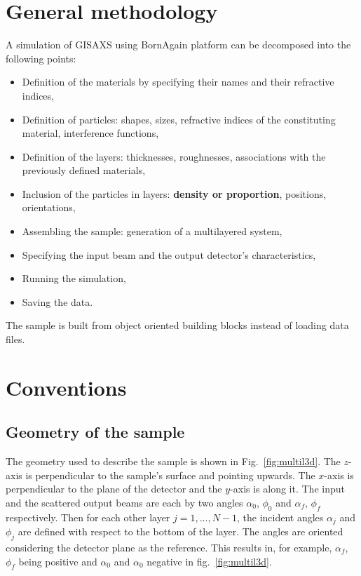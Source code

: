 \section{General methodology}
A simulation of GISAXS using BornAgain platform can be decomposed into the following points:
\begin{itemize}
\item Definition of the materials by specifying their names and their
  refractive indices,
\item Definition of particles: shapes, sizes, refractive indices of
  the constituting material, interference functions,
\item Definition of the layers: thicknesses, roughnesses, associations with the previously defined
materials,
\item Inclusion of the particles in layers: \textbf{density or proportion}, positions, orientations, 
\item Assembling the sample: generation of a multilayered system,
\item Specifying the input beam and the output detector's
  characteristics,
\item Running the simulation,
\item Saving the data.
\end{itemize}

\noindent The sample is built from object oriented building blocks instead of loading data files.

\section{Conventions}

\subsection{Geometry of the sample}

\noindent The geometry used to describe the sample is shown in
Fig.~\ref{fig:multil3d}. The $z$-axis is perpendicular to the sample's
surface and pointing upwards. The $x$-axis  is perpendicular to the
plane of the detector and the $y$-axis is along it. The input and the scattered output beams are each by two angles
$\alpha_0$, $\phi_0$ and $\alpha_f$, $\phi_f$ respectively. Then for each other layer
$j=1,..., N-1$, the incident angles $\alpha_j$ and $\phi_j$  are defined with
respect to the bottom of the layer. The angles are oriented
considering the detector plane as the reference. This results in, for example, 
$\alpha_f$, $\phi_f$ being positive and
$\alpha_0$ and $\alpha_0$ negative in fig.~\ref{fig:multil3d}. \\


